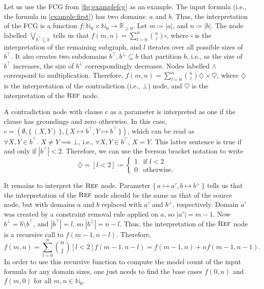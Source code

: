 \begin{example}\label{example:interpretation}
  Let us use the FCG from \cref{fig:examplefcg} as an example. The input formula
  (i.e., the formula in \cref{example:first}) has two domains: $a$ and $b$.
  Thus, the interpretation of the FCG is a function
  $f\colon \mathbb{N}_{0} \times \mathbb{N}_{0} \to \mathbb{R}_{\ge 0}$. Let
  $m \coloneqq |a|$, and $n \coloneqq |b|$. The node labelled
  $\bigvee_{b^{\top} \subseteq b}$ tells us that
  $f(m, n) = \sum_{l = 0}^{n} \binom{n}{l} \square$, where $\square$ is the
  interpretation of the remaining subgraph, and $l$ iterates over all possible
  sizes of $b^{\top}$. It also creates two subdomains
  $b^{\top}, b^{\bot} \subseteq b$ that partition $b$, i.e., as the size of
  $b^{\top}$ increases, the size of $b^{\bot}$ correspondingly decreases. Nodes
  labelled $\land$ correspond to multiplication. Therefore,
  $f(m, n) = \sum_{l = 0}^{n} \binom{n}{l} \diamondsuit \times \heartsuit$,
  where $\diamondsuit$ is the interpretation of the contradiction (i.e., $\bot$)
  node, and $\heartsuit$ is the interpretation of the $\operatorname{\textsc{Ref}}$ node.

  A contradiction node with clause $c$ as a parameter is interpreted as one if
  the clause has groundings and zero otherwise. In this case,
  $c = (\emptyset, \{\, (X, Y) \,\}, \{\, X \mapsto b^\top, Y \mapsto b^\top \,\})$,
  which can be read as $\forall X, Y \in b^{\top}\text{. }X \ne Y \implies \bot$, i.e., $\forall X, Y \in b^{\top}\text{, }X = Y$. This
  latter sentence is true if and only if $|b^{\top}| < 2$. Therefore, we can use
  the Iverson bracket notation to write
  \[
    \diamondsuit = [l < 2] \coloneqq
    \begin{cases}
      1 & \text{if } l < 2 \\
      0 & \text{otherwise.}
    \end{cases}
  \]

  It remains to interpret the $\operatorname{\textsc{Ref}}$ node. Parameter
  $\{\, a \mapsto a', b \mapsto b^\bot \,\}$ tells us that the interpretation of
  the $\operatorname{\textsc{Ref}}$ node should be the same as that of the source node, but with
  domains $a$ and $b$ replaced with $a'$ and $b^{\bot}$, respectively. Domain
  $a'$ was created by a constraint removal rule applied on $a$, so
  $|a'| = m - 1$. Now $b^{\bot} = b \setminus b^{\top}$, and $|b^{\top}| = l$,
  so $|b^{\bot}| = n - l$. Thus, the interpretation of the $\operatorname{\textsc{Ref}}$ node is a
  recursive call to $f(m - 1, n - l)$. Therefore,
  \begin{equation}\label{eq:solution}
    f(m, n) = \sum_{l = 0}^{n} \binom{n}{l} [l < 2] f(m-1, n-l) = f(m-1, n) + n f(m-1, n-1).
  \end{equation}
  In order to use this recursive function to compute the model count of the
  input formula for any domain sizes, one just needs to find the base cases
  $f(0, n)$ and $f(m, 0)$ for all $m, n \in \mathbb{N}_{0}$.
\end{example}

